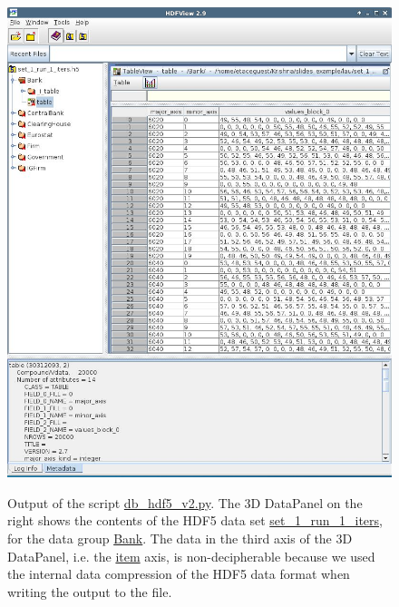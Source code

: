 \documentclass[10pt,a4paper]{article}
\begin{document}
\begin{figure}[htb!]
\centering\leavevmode
\graphicspath{{./hdf5_snapshots/}}
%
\centering\leavevmode
\includegraphics[scale=.4]{Fig_1_individual_hdf5_corresponding_to_db_agent_1.png} 
\label{Fig: h5 per run contents}
\caption{\footnotesize Output of the script \url{db_hdf5_v2.py}. The 3D DataPanel on the right shows the contents of the HDF5 data set \url{set_1_run_1_iters}, for the data group \url{Bank}. The data in the third axis of the 3D DataPanel, i.e. the \url{item} axis, is non-decipherable because we used the internal data compression of the HDF5 data format when writing the output to the file.}
\end{figure}
\end{document}
